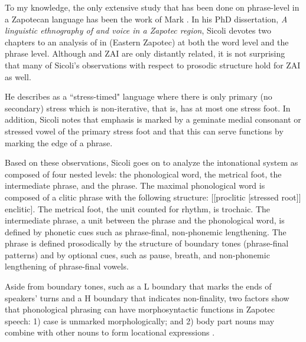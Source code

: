 To my knowledge, the only extensive study that has been done on phrase-level  in a Zapotecan language has been the work of Mark \citet{sicoli2007,sicoli2010}. In his PhD dissertation, \textit{A linguistic ethnography of  and voice in a Zapotec region}, Sicoli devotes two chapters to an analysis of  in   (Eastern Zapotec) at both the word level and the phrase level. Although   and ZAI are only distantly related, it is not surprising that many of Sicoli's observations with respect to prosodic structure hold for ZAI as well. 

He describes   as a ``stress-timed" language where there is only primary (no secondary) stress which is non-iterative, that is, has at most one stress foot. In addition, Sicoli notes that emphasis is marked by a geminate medial consonant or stressed vowel of the primary stress foot and that this can serve  functions by marking the edge of a phrase. 

Based on these observations, Sicoli goes on to analyze the intonational system as composed of four nested levels: the phonological word, the metrical foot, the intermediate phrase, and the  phrase. The maximal phonological word is composed of a clitic phrase with the following structure: [[proclitic [stressed root]] enclitic]. The metrical foot, the unit counted for rhythm, is trochaic. The intermediate phrase, a unit between the  phrase and the phonological word, is defined by phonetic cues such as phrase-final, non-phonemic lengthening. The  phrase is defined prosodically by the structure of boundary tones (phrase-final  patterns) and by optional cues, such as pause, breath, and non-phonemic lengthening of phrase-final vowels. 

Aside from boundary tones, such as a L boundary  that marks the ends of speakers' turns and a H boundary  that indicates non-finality, two factors show that phonological phrasing can have morphosyntactic functions in Zapotec speech: 1) case is unmarked morphologically; and 2) body part nouns may combine with other nouns to form locational expressions \citep[132]{sicoli2007}.

